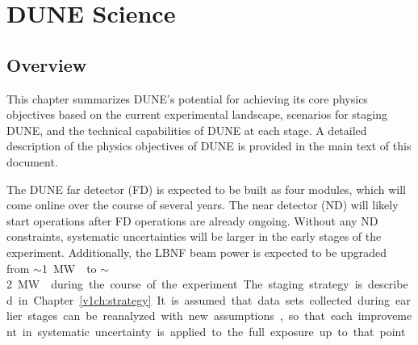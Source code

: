 
\chapter{DUNE Science}
\label{v1ch:science}

\section{Overview} %

This chapter summarizes DUNE's potential for achieving its core
physics objectives based on the current %
experimental landscape, scenarios for staging  DUNE, and 
the technical capabilities of DUNE at each stage. 
A detailed description of the physics objectives of DUNE is provided in
the main text of this document.  


The  DUNE far detector (FD) is expected to
be built as four  modules, which will come online over the course
of several years.  The near detector (ND) will likely start operations
after FD operations are already ongoing.  Without any ND constraints,
systematic uncertainties will be larger in the early stages of the
experiment. Additionally, the LBNF beam power is expected to be upgraded
from $\sim$\SI{1}\MW{} to $\sim$\SI{2}\MW{} during the course of the experiment. 
The staging strategy is described in Chapter~\ref{v1ch:strategy}. 
It is assumed that data sets collected during earlier stages can be reanalyzed with new
assumptions, so that each improvement in systematic uncertainty is applied
to the full exposure up to that point.


